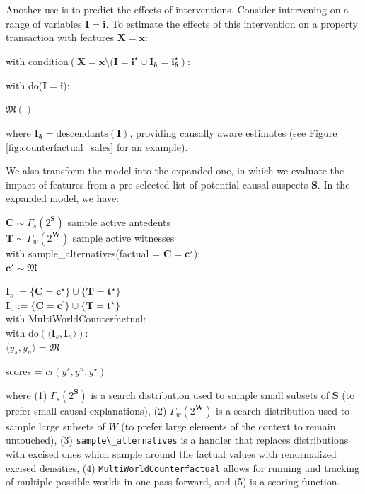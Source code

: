 \documentclass[anon,12pt]{clear2025} %
\renewcommand{\texttt}[1]{\lstinline[basicstyle=\fontsize{8pt}{8.25pt}\selectfont\ttfamily]{#1}}
\begin{document}
Another use is to predict the effects of interventions. Consider intervening on a range of variables
$\mathbf{I}= \mathbf{i}$. To estimate the effects of this intervention on a property transaction with features
$\mathbf{X=x}$:
\begin{docode}
with condition$\left( \mathbf{X}= \mathbf{x} \setminus (\mathbf{I}= \mathbf{i^\star} \cup  \mathbf{I_\delta}   = \mathbf{i_\delta^\star}\right):$

\hspace*{2em}  with do($\mathbf{I}=\mathbf{i}$):

  \hspace*{5em} $\mathfrak{M}()$
\end{docode}
\noindent where  $\mathbf{I_\delta} = \mathrm{descendants}(\mathbf{I})$, providing causally aware estimates  (see Figure \ref{fig:counterfactual_sales} for an example).

We also transform the model into the expanded one, in which we evaluate the impact of features from a pre-selected list of potential causal suspects $\mathbf{S}$. In the expanded model, we have:
\begin{docode}
$\mathbf{C} \sim \Gamma_s(2^\mathbf{S})$   sample active antedents \\
$\mathbf{T} \sim \Gamma_w(2^\mathbf{W})$ sample active witnesses \\
with sample\_alternatives(factual = $\mathbf{C} = \mathbf{c^\star}$): \\
\hspace*{2em} $\mathbf{c'} \sim \mathfrak{M}$

\vspace{2mm}

$\mathbf{I}_s   := \{\mathbf{C} = \mathbf{c^\star}\} \cup \{ \mathbf{T} = \mathbf{t^\star}\}$ \\
$\mathbf{I}_n := \{ \mathbf{C} = \mathbf{c^{\prime}} \} \cup \{ \mathbf{T} = \mathbf{t^{\star}} \}$ \\

with MultiWorldCounterfactual: \\
\hspace*{2em}  with do$\left( \langle \mathbf{I}_s, \mathbf{I}_n \rangle \right) $: \\
\hspace*{4em} $\langle y_s, y_n \rangle = \mathfrak{M}$

\vspace{2mm}

scores = $ci(y^s, y^n, y^\star)$

\end{docode}
\noindent where (1) $\Gamma_s(2^\mathbf{S})$ is a search distribution used to sample small subsets of $\mathbf{S}$ (to prefer small causal explanations), 
(2) $\Gamma_w(2^\mathbf{W})$ is a search distribution used to sample large subsets of $W$ (to prefer large elements of the context to remain untouched), (3) \texttt{sample\_alternatives} is a handler that replaces distributions with excised ones which sample around the factual values with renormalized excised densities, (4) \texttt{MultiWorldCounterfactual} allows for running and tracking of multiple possible worlds in one pass forward, and (5) is a scoring function.
\end{document}
